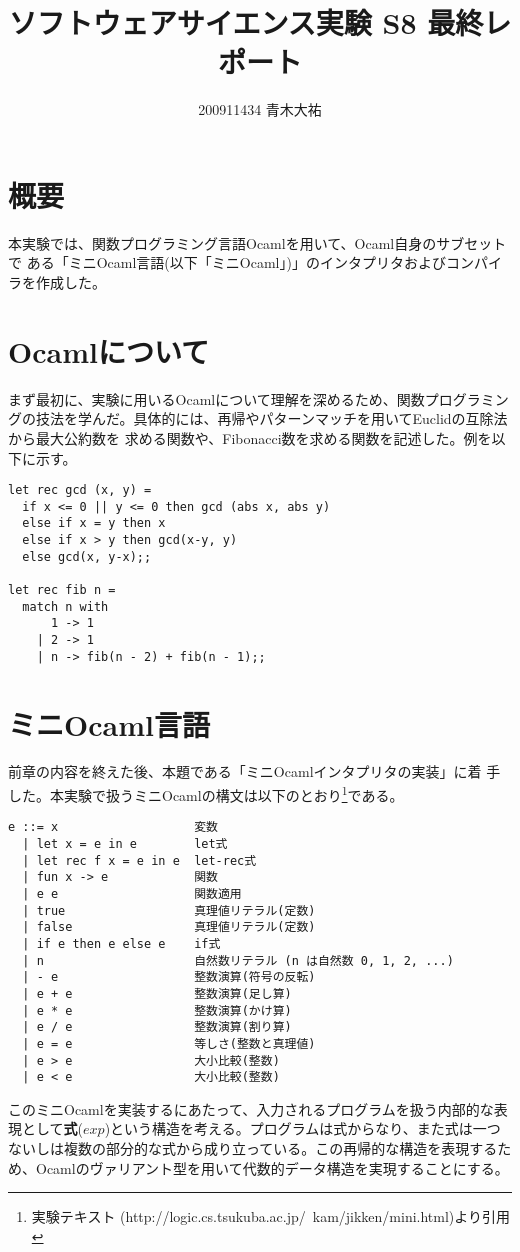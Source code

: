 \documentclass[a4paper,9pt]{jsarticle}
\title{ソフトウェアサイエンス実験 S8 最終レポート}
\author{200911434 青木大祐}
\begin{document}
\maketitle
\newpage

\section{概要}
本実験では、関数プログラミング言語Ocamlを用いて、Ocaml自身のサブセットで
ある「ミニOcaml言語(以下「ミニOcaml」)」のインタプリタおよびコンパイラを作成した。

\section{Ocamlについて}
まず最初に、実験に用いるOcamlについて理解を深めるため、関数プログラミン
グの技法を学んだ。具体的には、再帰やパターンマッチを用いてEuclidの互除法から最大公約数を
求める関数や、Fibonacci数を求める関数を記述した。例を以下に示す。


\begin{lstlisting}
let rec gcd (x, y) =   
  if x <= 0 || y <= 0 then gcd (abs x, abs y)
  else if x = y then x
  else if x > y then gcd(x-y, y)
  else gcd(x, y-x);;

let rec fib n = 
  match n with
      1 -> 1
    | 2 -> 1
    | n -> fib(n - 2) + fib(n - 1);;
\end{lstlisting}

\section{ミニOcaml言語}
前章の内容を終えた後、本題である「ミニOcamlインタプリタの実装」に着
手した。本実験で扱うミニOcamlの構文は以下のとおり\footnote{実験テキスト
(http://logic.cs.tsukuba.ac.jp/~kam/jikken/mini.html)より引用}である。

\begin{lstlisting}
e ::= x                   変数
  | let x = e in e        let式
  | let rec f x = e in e  let-rec式
  | fun x -> e            関数
  | e e	                  関数適用
  | true                  真理値リテラル(定数)
  | false                 真理値リテラル(定数)
  | if e then e else e    if式
  | n                     自然数リテラル (n は自然数 0, 1, 2, ...)
  | - e                   整数演算(符号の反転)
  | e + e                 整数演算(足し算)
  | e * e                 整数演算(かけ算)
  | e / e                 整数演算(割り算)
  | e = e                 等しさ(整数と真理値)
  | e > e                 大小比較(整数)
  | e < e                 大小比較(整数)
\end{lstlisting}
このミニOcamlを実装するにあたって、入力されるプログラムを扱う内部的な表
現として{\bf{式}}($exp$)という構造を考える。プログラムは式からなり、また式は一つ
ないしは複数の部分的な式から成り立っている。この再帰的な構造を表現するた
め、Ocamlのヴァリアント型を用いて代数的データ構造を実現することにする。\\
\end{document}
